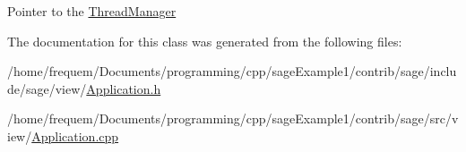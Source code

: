 Pointer to the \mbox{\hyperlink{classsage_1_1ThreadManager}{Thread\+Manager}} 

The documentation for this class was generated from the following files\+:\begin{DoxyCompactItemize}
\item 
/home/frequem/\+Documents/programming/cpp/sage\+Example1/contrib/sage/include/sage/view/\mbox{\hyperlink{Application_8h}{Application.\+h}}\item 
/home/frequem/\+Documents/programming/cpp/sage\+Example1/contrib/sage/src/view/\mbox{\hyperlink{Application_8cpp}{Application.\+cpp}}\end{DoxyCompactItemize}
